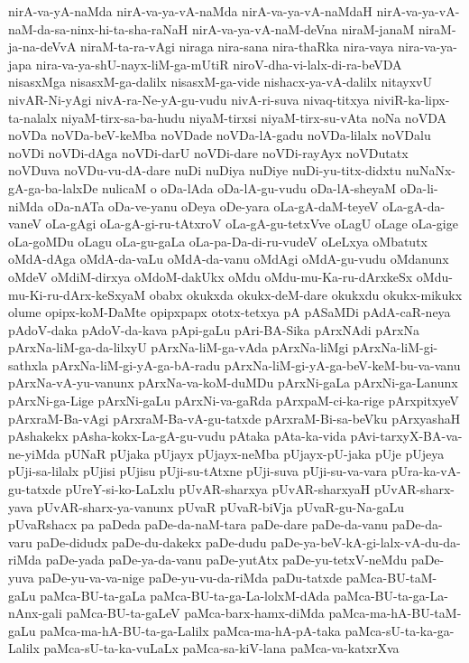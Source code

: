 {nirA-va-yA-naMda
nirA-va-ya-vA-naMda
nirA-va-ya-vA-naMdaH
nirA-va-ya-vA-naM-da-sa-ninx-hi-ta-sha-raNaH
nirA-va-ya-vA-naM-deVna
niraM-janaM
niraM-ja-na-deVvA
niraM-ta-ra-vAgi
niraga
nira-sana
nira-thaRka
nira-vaya
nira-va-ya-japa
nira-va-ya-shU-nayx-liM-ga-mUtiR
niroV-dha-vi-lalx-di-ra-beVDA
nisasxMga
nisasxM-ga-dalilx
nisasxM-ga-vide
nishacx-ya-vA-dalilx
nitayxvU
nivAR-Ni-yAgi
nivA-ra-Ne-yA-gu-vudu
nivA-ri-suva
nivaq-titxya
niviR-ka-lipx-ta-nalalx
niyaM-tirx-sa-ba-hudu
niyaM-tirxsi
niyaM-tirx-su-vAta
noNa
noVDA
noVDa
noVDa-beV-keMba
noVDade
noVDa-lA-gadu
noVDa-lilalx
noVDalu
noVDi
noVDi-dAga
noVDi-darU
noVDi-dare
noVDi-rayAyx
noVDutatx
noVDuva
noVDu-vu-dA-dare
nuDi
nuDiya
nuDiye
nuDi-yu-titx-didxtu
nuNaNx-gA-ga-ba-lalxDe
nulicaM
o
oDa-lAda
oDa-lA-gu-vudu
oDa-lA-sheyaM
oDa-li-niMda
oDa-nATa
oDa-ve-yanu
oDeya
oDe-yara
oLa-gA-daM-teyeV
oLa-gA-da-vaneV
oLa-gAgi
oLa-gA-gi-ru-tAtxroV
oLa-gA-gu-tetxVve
oLagU
oLage
oLa-gige
oLa-goMDu
oLagu
oLa-gu-gaLa
oLa-pa-Da-di-ru-vudeV
oLeLxya
oMbatutx
oMdA-dAga
oMdA-da-vaLu
oMdA-da-vanu
oMdAgi
oMdA-gu-vudu
oMdanunx
oMdeV
oMdiM-dirxya
oMdoM-dakUkx
oMdu
oMdu-mu-Ka-ru-dArxkeSx
oMdu-mu-Ki-ru-dArx-keSxyaM
obabx
okukxda
okukx-deM-dare
okukxdu
okukx-mikukx
olume
opipx-koM-DaMte
opipxpapx
ototx-tetxya
pA
pASaMDi
pAdA-caR-neya
pAdoV-daka
pAdoV-da-kava
pApi-gaLu
pAri-BA-Sika
pArxNAdi
pArxNa
pArxNa-liM-ga-da-lilxyU
pArxNa-liM-ga-vAda
pArxNa-liMgi
pArxNa-liM-gi-sathxla
pArxNa-liM-gi-yA-ga-bA-radu
pArxNa-liM-gi-yA-ga-beV-keM-bu-va-vanu
pArxNa-vA-yu-vanunx
pArxNa-va-koM-duMDu
pArxNi-gaLa
pArxNi-ga-Lanunx
pArxNi-ga-Lige
pArxNi-gaLu
pArxNi-va-gaRda
pArxpaM-ci-ka-rige
pArxpitxyeV
pArxraM-Ba-vAgi
pArxraM-Ba-vA-gu-tatxde
pArxraM-Bi-sa-beVku
pArxyashaH
pAshakekx
pAsha-kokx-La-gA-gu-vudu
pAtaka
pAta-ka-vida
pAvi-tarxyX-BA-va-ne-yiMda
pUNaR
pUjaka
pUjayx
pUjayx-neMba
pUjayx-pU-jaka
pUje
pUjeya
pUji-sa-lilalx
pUjisi
pUjisu
pUji-su-tAtxne
pUji-suva
pUji-su-va-vara
pUra-ka-vA-gu-tatxde
pUreY-si-ko-LaLxlu
pUvAR-sharxya
pUvAR-sharxyaH
pUvAR-sharx-yava
pUvAR-sharx-ya-vanunx
pUvaR
pUvaR-biVja
pUvaR-gu-Na-gaLu
pUvaRshacx
pa
paDeda
paDe-da-naM-tara
paDe-dare
paDe-da-vanu
paDe-da-varu
paDe-didudx
paDe-du-dakekx
paDe-dudu
paDe-ya-beV-kA-gi-lalx-vA-du-da-riMda
paDe-yada
paDe-ya-da-vanu
paDe-yutAtx
paDe-yu-tetxV-neMdu
paDe-yuva
paDe-yu-va-va-nige
paDe-yu-vu-da-riMda
paDu-tatxde
paMca-BU-taM-gaLu
paMca-BU-ta-gaLa
paMca-BU-ta-ga-La-lolxM-dAda
paMca-BU-ta-ga-La-nAnx-gali
paMca-BU-ta-gaLeV
paMca-barx-hamx-diMda
paMca-ma-hA-BU-taM-gaLu
paMca-ma-hA-BU-ta-ga-Lalilx
paMca-ma-hA-pA-taka
paMca-sU-ta-ka-ga-Lalilx
paMca-sU-ta-ka-vuLaLx
paMca-sa-kiV-lana
paMca-va-katxrXva
}
